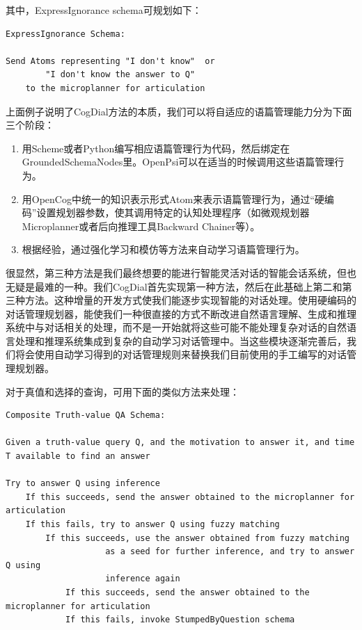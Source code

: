 \noindent 其中，ExpressIgnorance schema可规划如下：

\begin{verbatim}
ExpressIgnorance Schema:

Send Atoms representing "I don't know"  or
        "I don't know the answer to Q"
	to the microplanner for articulation
\end{verbatim}

上面例子说明了CogDial方法的本质，我们可以将自适应的语篇管理能力分为下面三个阶段：

\begin{enumerate}
\item 用Scheme或者Python编写相应语篇管理行为代码，然后绑定在GroundedSchemaNodes里。OpenPsi可以在适当的时候调用这些语篇管理行为。
\item 用OpenCog中统一的知识表示形式Atom来表示语篇管理行为，通过“硬编码”设置规划器参数，使其调用特定的认知处理程序（如微观规划器Microplanner或者后向推理工具Backward Chainer等）。
\item 根据经验，通过强化学习和模仿等方法来自动学习语篇管理行为。
\end{enumerate}

\noindent 很显然，第三种方法是我们最终想要的能进行智能灵活对话的智能会话系统，但也无疑是最难的一种。我们CogDial首先实现第一种方法，然后在此基础上第二和第三种方法。这种增量的开发方式使我们能逐步实现智能的对话处理。使用硬编码的对话管理规划器，能使我们一种很直接的方式不断改进自然语言理解、生成和推理系统中与对话相关的处理，而不是一开始就将这些可能不能处理复杂对话的自然语言处理和推理系统集成到复杂的自动学习对话管理中。当这些模块逐渐完善后，我们将会使用自动学习得到的对话管理规则来替换我们目前使用的手工编写的对话管理规划器。

对于真值和选择的查询，可用下面的类似方法来处理：

\begin{verbatim}
Composite Truth-value QA Schema:

Given a truth-value query Q, and the motivation to answer it, and time T available to find an answer

Try to answer Q using inference
	If this succeeds, send the answer obtained to the microplanner for articulation
	If this fails, try to answer Q using fuzzy matching
		If this succeeds, use the answer obtained from fuzzy matching
					as a seed for further inference, and try to answer Q using
					inference again
			If this succeeds, send the answer obtained to the microplanner for articulation
		 	If this fails, invoke StumpedByQuestion schema	
\end{verbatim}	

